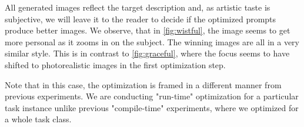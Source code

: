 All generated images reflect the target description and, as artistic taste is subjective, we will leave it to the reader 
to decide if the optimized prompts produce better images. We observe, that in \ref{fig:wistful}, the image seems to get more personal as it zooms in on the subject.
The winning images are all in a very similar style. This is in contrast to \ref{fig:graceful}, where the focus seems to have shifted to 
photorealistic images in the first optimization step.

Note that in this case, the optimization is framed in a different manner from previous experiments.
We are conducting "run-time" optimization for a particular task instance unlike previous "compile-time" experiments, where we optimized for a whole task class.

